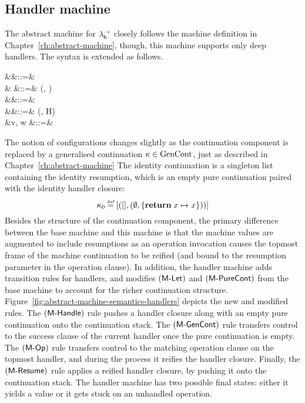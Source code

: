 \documentclass[12pt,phd,lfcs,twoside,openright,logo,leftchapter,normalheadings]{infthesis}
\theoremstyle{plain}
\theoremstyle{definition}
\begin{document}
\subsection{Handler machine}
\label{sec:handler-machine}
\newcommand{\HClosure}{\dec{HClo}}
%
The abstract machine for $\lambda^\rightarrow_{\mathsf{h}}$ closely follows the machine
definition in Chapter~\ref{ch:abstract-machine}, though, this machine
supports only deep handlers.
%
The syntax is extended as follows.
%
{
\begin{syntax}
              &\conf \in \Conf &::=& \\
                 &\rho \in {} &::=& (\sigma, \chi)\\
               &\kappa \in \MGContCat &::=& \nil \mid \rho \cons \kappa\\
   &\chi \in \MGFrameCat  &::=& (\env, H) \\
     &v, w \in \MValCat  &::=& \cdots \mid \rho \\
\end{syntax}}%
%
The notion of configurations changes slightly as the continuation
component is replaced by a generalised continuation
$\kappa \in \textrm{GenCont}$, just as described in Chapter~\ref{ch:abstract-machine}%
%
%
The identity continuation is a singleton list containing the identity
resumption, which is an empty pure continuation paired with the
identity handler closure:
%
{
\[
\kappa_0 \defas [(\nil, (\emptyset, \{\Return\;x \mapsto x\}))]
\]}%
%
Besides the structure of the continuation component, the primary
difference between the base machine and this machine is that the
machine values are augmented to include resumptions as an operation
invocation causes the topmost frame of the machine continuation to be
reified (and bound to the resumption parameter in the operation
clause).
%
In addition, the handler machine adds transition rules for handlers,
and modifies $(\mathsf{M\textrm{-}Let})$ and $(\mathsf{M\textrm{-}PureCont})$ from the base
machine to account for the richer continuation
structure. Figure~\ref{fig:abstract-machine-semantics-handlers}
depicts the new and modified rules.
%
The $(\mathsf{M\textrm{-}Handle})$ rule pushes a handler closure along with an
empty pure continuation onto the continuation stack.
%
The $(\mathsf{M\textrm{-}GenCont})$ rule transfers control to the success clause
of the current handler once the pure continuation is empty.
%
The $(\mathsf{M\textrm{-}Op})$ rule transfers control to the matching
operation clause on the topmost handler, and during the process it
reifies the handler closure. Finally, the $(\mathsf{M\textrm{-}Resume})$ rule
applies a reified handler closure, by pushing it onto the continuation
stack.
%
The handler machine has two possible final states: either it yields a
value or it gets stuck on an unhandled operation.
\end{document}
